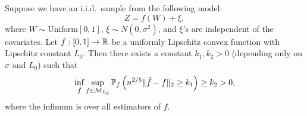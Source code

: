 \begin{lemma}\label{lem:1dConvexreg}
 Suppose we have an i.i.d.~sample from the following model:
\begin{equation}\label{eq:1dimConvex}
Z= f(W) +\xi,
\end{equation}
where $W\sim\text{Uniform}[0,1]$, $\xi\sim N(0, \sigma^2)$, and $\xi$'s are independent of the covariates. Let $f: [0,1]\to \mathbb{R}$ be a uniformly Lipschitz convex function with Lipschitz constant $L_0$. Then there exists a constant $k_1, k_2>0$ (depending only on $\sigma$ and $L_0$) such that  \begin{equation}\label{eq:1dConvexRegBound}
\inf_{\hat{f}} \sup_{f \in \mathcal{M}_{L_0}} \mathbb{P}_{f}\left(n^{2/5} \|\hat{f}-f\|_2 \ge k_1 \right) \ge k_2 > 0,
\end{equation} 
where the infimum is over all estimators of $f.$
 \end{lemma}
